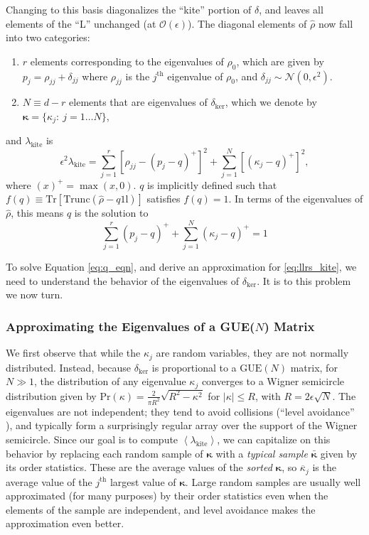 \documentclass[aps,pra, twocolumn]{revtex4-1}
\newcommand{\Tr}{\mathrm{Tr}}
\newcommand{\expect}[1]{\ensuremath{\left\langle#1\right\rangle}}
\def\Id{1\!\mathrm{l}}
\newcommand{\bvec}[1]{\boldsymbol{#1}}
\newcommand{\rhohat}{\hat{\rho}}
\begin{document}
Changing to this basis diagonalizes the ``kite'' portion of $\delta$, and leaves all elements of the ``L'' unchanged (at $\mathcal{O}(\epsilon)$).  The diagonal elements of $\hat\rho$ now fall into two categories:
\begin{enumerate}[noitemsep]
\item $r$ elements corresponding to the eigenvalues of $\rho_0$, which are given by $p_{j} = \rho_{jj} + \delta_{jj}$ where  $\rho_{jj}$ is the $j^{\mathrm{th}}$ eigenvalue of $\rho_{0}$, and $\delta_{jj} \sim \mathcal{N}(0,\epsilon^2)$.
\item $N \equiv d-r$ elements that are eigenvalues of $\delta_{\mathrm{ker}}$, which we denote by $\bvec{\kappa} = \{\kappa_j:~j = 1\ldots 
N\}$,
\end{enumerate}
and $\lambda_{\mathrm{kite}}$ is
\begin{equation}
\label{eq:llrs_kite}
\epsilon^{2}\lambda_{\mathrm{kite}} = \sum_{j=1}^{r}[\rho_{jj}- (p_j-q)^{+}]^2 + \sum_{j=1}^{N}\left[(\kappa_j-q)^+\right]^2,
\end{equation}
where $(x)^{+} = \max(x, 0)$. $q$ is implicitly defined such that $f(q) \equiv \Tr\left[\mathrm{Trunc}(\hat\rho - q \Id)\right]$ satisfies $f(q) = 1$. In terms of the eigenvalues of $\rhohat$, this means $q$ is the solution to
\begin{equation}
\label{eq:q_eqn}
 \sum_{j=1}^{r}(p_j - q)^{+} + \sum_{j=1}^{N}{(\kappa_j-q)^+} = 1
\end{equation}

To solve Equation \eqref{eq:q_eqn}, and derive an approximation for \eqref{eq:llrs_kite}, we need to understand the behavior of the eigenvalues of $\delta_{\mathrm{ker}}$. It is to this problem we now turn.

\subsubsection{Approximating the Eigenvalues of a GUE($N$) Matrix}
We first observe that while the $\kappa_j$ are random variables, they are not normally distributed.  Instead, because $\delta_{\mathrm{ker}}$ is proportional to a $\mathrm{GUE}(N)$ matrix, for $N\gg1$, the distribution of any eigenvalue $\kappa_{j}$
converges to a Wigner semicircle distribution \cite{Wigner1958} given by $\mathrm{Pr}(\kappa) = \frac{2}{\pi R^{2}}\sqrt{R^{2}-\kappa^{2}}$ for $|\kappa| \leq R$, with $R = 2\epsilon\sqrt{N}$.  The eigenvalues are not independent; they tend to avoid collisions (``level avoidance'' \cite{Tao2013}), 
and typically form a surprisingly regular array over the support of the Wigner semicircle.  Since our goal is to compute $\expect{\lambda_{\mathrm{kite}}}$, we can capitalize on this behavior by replacing each random sample of $\bvec{\kappa}$ with a 
\emph{typical sample} $\bar{\bvec{\kappa}}$ given by its order statistics.  These are the average values of the \emph{sorted} 
$\bvec{\kappa}$, so $\overline{\kappa}_j$ is the average value of the $j^{\mathrm{th}}$ largest value of $\bvec{\kappa}$.  Large random samples 
are usually well approximated (for many purposes) by their order statistics even when the elements of the sample are 
independent, and level avoidance makes the approximation even better. 
\end{document}
